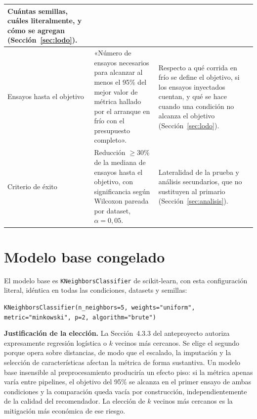 \documentclass[11pt,letterpaper]{article}
\begin{document}
\begin{table}[htbp]
\begin{tabularx}{\textwidth}{L{4.1cm} L{4.3cm} Y}
Cuántas semillas, cuáles literalmente, y cómo se agregan
(Sección~\ref{sec:lodo}). \\
\midrule
Ensayos hasta el objetivo &
«Número de ensayos necesarios para alcanzar al menos el 95\% del mejor valor de
métrica hallado por el arranque en frío con el presupuesto completo». &
Respecto a qué corrida en frío se define el objetivo, si los ensayos inyectados
cuentan, y qué se hace cuando una condición no alcanza el objetivo
(Sección~\ref{sec:lodo}). \\
\midrule
Criterio de éxito &
Reducción $\geq 30\%$ de la mediana de ensayos hasta el objetivo, con
significancia según Wilcoxon pareada por dataset, $\alpha = 0{,}05$. &
Lateralidad de la prueba y análisis secundarios, que no sustituyen al primario
(Sección~\ref{sec:analisis}). \\
\bottomrule
\end{tabularx}
\end{table}

\section{Modelo base congelado}
\label{sec:modelo}

El modelo base es \texttt{KNeighborsClassifier} de scikit-learn, con esta
configuración literal, idéntica en todas las condiciones, datasets y semillas:

\begin{center}
%
\texttt{KNeighborsClassifier(n\_neighbors=5, weights="uniform",\\
metric="minkowski", p=2, algorithm="brute")}%
\end{center}

\textbf{Justificación de la elección.} La Sección~4.3.3 del anteproyecto autoriza
expresamente regresión logística o $k$ vecinos más cercanos. Se elige el segundo
porque opera sobre distancias, de modo que el escalado, la imputación y la
selección de características afectan la métrica de forma sustantiva. Un modelo
base insensible al preprocesamiento produciría un efecto piso: si la métrica
apenas varía entre pipelines, el objetivo del 95\% se alcanza en el primer
ensayo de ambas condiciones y la comparación queda vacía por construcción,
independientemente de la calidad del recomendador. La elección de $k$ vecinos más
cercanos es la mitigación más económica de ese riesgo.
\end{document}
